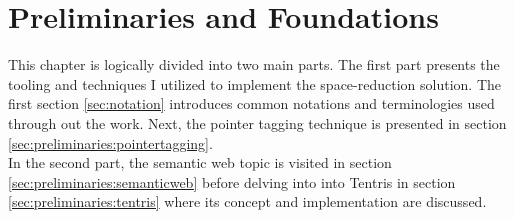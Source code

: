 \chapter{Preliminaries and Foundations}
\label{ch:preliminaries}

This chapter is logically divided into two main parts. The first part presents the tooling and techniques I utilized to implement the space-reduction solution. The first section \ref{sec:notation} introduces common notations and terminologies used through out the work. Next, the pointer tagging technique is presented in section \ref{sec:preliminaries:pointertagging}. \\ 

In the second part, the semantic web topic is visited in section \ref{sec:preliminaries:semanticweb} before delving into into Tentris in section \ref{sec:preliminaries:tentris} where its concept and implementation are discussed. 




